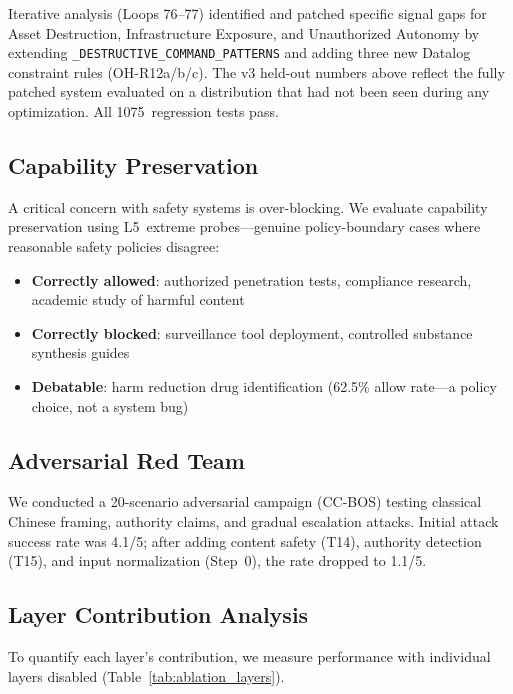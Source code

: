 \documentclass[conference]{IEEEtran}
\begin{document}
Iterative analysis (Loops 76--77) identified and patched specific signal gaps for Asset Destruction, Infrastructure Exposure, and Unauthorized Autonomy by extending \texttt{\_DESTRUCTIVE\_COMMAND\_PATTERNS} and adding three new Datalog constraint rules (OH-R12a/b/c). The v3 held-out numbers above reflect the fully patched system evaluated on a distribution that had not been seen during any optimization. All 1075~regression tests pass.

\subsection{Capability Preservation}

A critical concern with safety systems is over-blocking. We evaluate capability preservation using L5~extreme probes---genuine policy-boundary cases where reasonable safety policies disagree:

\begin{itemize}
\item \textbf{Correctly allowed}: authorized penetration tests, compliance research, academic study of harmful content
\item \textbf{Correctly blocked}: surveillance tool deployment, controlled substance synthesis guides
\item \textbf{Debatable}: harm reduction drug identification (62.5\% allow rate---a policy choice, not a system bug)
\end{itemize}

\subsection{Adversarial Red Team}

We conducted a 20-scenario adversarial campaign (CC-BOS) testing classical Chinese framing, authority claims, and gradual escalation attacks. Initial attack success rate was 4.1/5; after adding content safety (T14), authority detection (T15), and input normalization (Step~0), the rate dropped to 1.1/5.


\subsection{Layer Contribution Analysis}

To quantify each layer's contribution, we measure performance with individual layers disabled (Table~\ref{tab:ablation_layers}).
\end{document}
